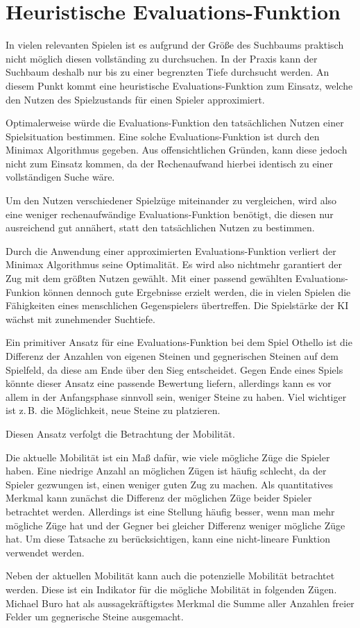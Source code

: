 \section{Heuristische Evaluations-Funktion}

In vielen relevanten Spielen ist es aufgrund der Größe des Suchbaums praktisch nicht möglich diesen vollständing zu
durchsuchen. In der Praxis kann der Suchbaum deshalb nur bis zu einer begrenzten Tiefe durchsucht werden. An diesem
Punkt kommt eine heuristische Evaluations-Funktion zum Einsatz, welche den Nutzen des Spielzustands für einen Spieler
approximiert.
\cite[S.~171]{ai2010russel}

Optimalerweise würde die Evaluations-Funktion den tatsächlichen Nutzen einer Spielsituation bestimmen. Eine solche
Evaluations-Funktion ist durch den Minimax Algorithmus gegeben. Aus offensichtlichen Gründen, kann diese jedoch nicht
zum Einsatz kommen, da der Rechenaufwand hierbei identisch zu einer vollständigen Suche wäre.

Um den Nutzen verschiedener Spielzüge miteinander zu vergleichen, wird also eine weniger rechenaufwändige
Evaluations-Funktion benötigt, die diesen nur ausreichend gut annähert, statt den tatsächlichen Nutzen zu bestimmen.

Durch die Anwendung einer approximierten Evaluations-Funktion verliert der Minimax Algorithmus seine Optimalität. Es
wird also nichtmehr garantiert der Zug mit dem größten Nutzen gewählt. Mit einer passend gewählten Evaluations-Funkion
können dennoch gute Ergebnisse erzielt werden, die in vielen Spielen die Fähigkeiten eines menschlichen Gegenspielers
übertreffen. Die Spielstärke der KI wächst mit zunehmender Suchtiefe.

Ein primitiver Ansatz für eine Evaluations-Funktion bei dem Spiel Othello ist die Differenz der Anzahlen von eigenen
Steinen und gegnerischen Steinen auf dem Spielfeld, da diese am Ende über den Sieg entscheidet. Gegen Ende eines Spiels
könnte dieser Ansatz eine passende Bewertung liefern, allerdings kann es vor allem in der Anfangsphase sinnvoll sein,
weniger Steine zu haben. Viel wichtiger ist z.\,B. die Möglichkeit, neue Steine zu platzieren.

Diesen Ansatz verfolgt die Betrachtung der Mobilität.

Die aktuelle Mobilität ist ein Maß dafür, wie viele mögliche Züge die Spieler haben. Eine niedrige Anzahl an möglichen
Zügen ist häufig schlecht, da der Spieler gezwungen ist, einen weniger guten Zug zu machen. Als quantitatives Merkmal
kann zunächst die Differenz der möglichen Züge beider Spieler betrachtet werden. Allerdings ist eine Stellung häufig
besser, wenn man mehr mögliche Züge hat und der Gegner bei gleicher Differenz weniger mögliche Züge hat. Um diese
Tatsache zu berücksichtigen, kann eine nicht-lineare Funktion verwendet werden.
\cite[S. 7]{evaluationfunctions}

Neben der aktuellen Mobilität kann auch die potenzielle Mobilität betrachtet werden. Diese ist ein Indikator für die
mögliche Mobilität in folgenden Zügen. Michael Buro hat als aussagekräftigstes Merkmal die Summe aller Anzahlen freier
Felder um gegnerische Steine ausgemacht.
\cite[S. 8f.]{evaluationfunctions}
